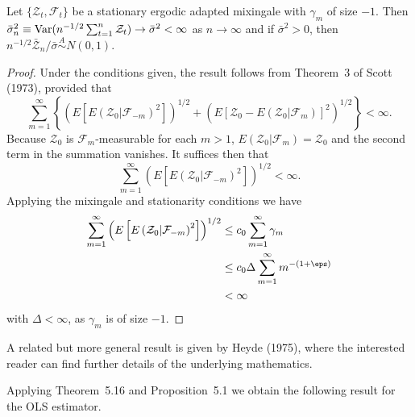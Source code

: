 \begin{theorem}[Scott]\label{thm:scott}
Let $\{\mathcal{Z}_t, \mathcal{F}_t\}$ be a stationary ergodic adapted mixingale with $\gamma_m$ of size $-1$. Then $\bar{\sigma}_n^2 \equiv \operatorname{Var}(n^{-1/2}\sum_{t=1}^{n}\mathcal{Z}_t) \to \bar{\sigma}^2 < \infty$ as $n \to \infty$ and if $\bar{\sigma}^2 > 0$, then $n^{-1/2}\bar{\mathcal{Z}}_n/\bar{\sigma} \overset{A}{\sim} N(0,1)$.
\end{theorem}

\begin{proof}
Under the conditions given, the result follows from Theorem~3 of Scott (1973), provided that
\[
\sum_{m=1}^{\infty}\left\{\left(E\left[E\left(\mathcal{Z}_0|\mathcal{F}_{-m}\right)^2\right]\right)^{1/2} + \left(E\left[\mathcal{Z}_0 - E\left(\mathcal{Z}_0|\mathcal{F}_m\right)\right]^2\right)^{1/2}\right\} < \infty.
\]
Because $\mathcal{Z}_0$ is $\mathcal{F}_m$-measurable for each $m > 1$, $E(\mathcal{Z}_0|\mathcal{F}_m) = \mathcal{Z}_0$ and the second term in the summation vanishes. It suffices then that
\[
\sum_{m=1}^{\infty}\left(E\left[E\left(\mathcal{Z}_0|\mathcal{F}_{-m}\right)^2\right]\right)^{1/2} < \infty.
\]
Applying the mixingale and stationarity conditions we have
\begin{align*}
\sum_{m=1}^{\infty}\left(E\left[E\left(\mathcal{Z}_0|\mathcal{F}_{-m}\right)^2\right]\right)^{1/2} &\leq c_0 \sum_{m=1}^{\infty}\gamma_m \\
&\leq c_0 \Delta \sum_{m=1}^{\infty}m^{-(1+\eps)} \\
&< \infty
\end{align*}
with $\Delta < \infty$, as $\gamma_m$ is of size $-1$.
\end{proof}

A related but more general result is given by Heyde (1975), where the interested reader can find further details of the underlying mathematics.

Applying Theorem~5.16 and Proposition~5.1 we obtain the following result for the OLS estimator.

